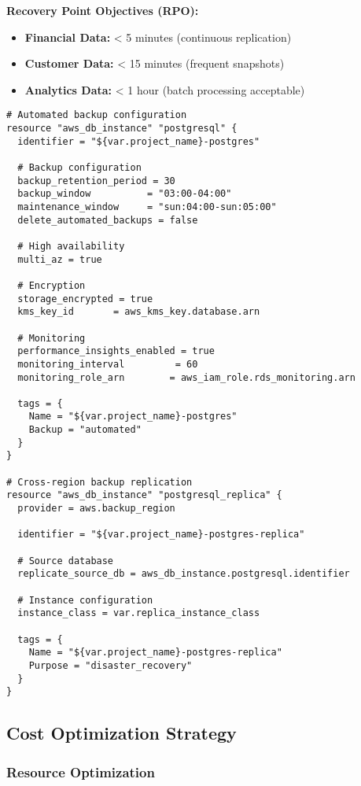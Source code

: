 \textbf{Recovery Point Objectives (RPO):}
\begin{itemize}
  \item \textbf{Financial Data:} < 5 minutes (continuous replication)
  \item \textbf{Customer Data:} < 15 minutes (frequent snapshots)
  \item \textbf{Analytics Data:} < 1 hour (batch processing acceptable)
\end{itemize}

\begin{verbatim}
# Automated backup configuration
resource "aws_db_instance" "postgresql" {
  identifier = "${var.project_name}-postgres"
  
  # Backup configuration
  backup_retention_period = 30
  backup_window          = "03:00-04:00"
  maintenance_window     = "sun:04:00-sun:05:00"
  delete_automated_backups = false
  
  # High availability
  multi_az = true
  
  # Encryption
  storage_encrypted = true
  kms_key_id       = aws_kms_key.database.arn
  
  # Monitoring
  performance_insights_enabled = true
  monitoring_interval         = 60
  monitoring_role_arn        = aws_iam_role.rds_monitoring.arn
  
  tags = {
    Name = "${var.project_name}-postgres"
    Backup = "automated"
  }
}

# Cross-region backup replication
resource "aws_db_instance" "postgresql_replica" {
  provider = aws.backup_region
  
  identifier = "${var.project_name}-postgres-replica"
  
  # Source database
  replicate_source_db = aws_db_instance.postgresql.identifier
  
  # Instance configuration
  instance_class = var.replica_instance_class
  
  tags = {
    Name = "${var.project_name}-postgres-replica"
    Purpose = "disaster_recovery"
  }
}
\end{verbatim}

\subsection{Cost Optimization Strategy}

\subsubsection{Resource Optimization}

